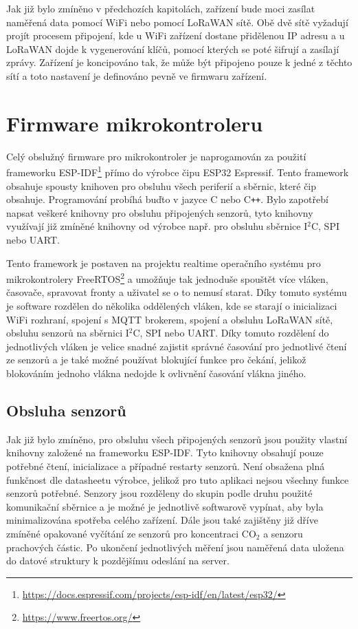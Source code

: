 Jak již bylo zmíněno v předchozích kapitolách, zařízení bude moci zasílat naměřená data pomocí WiFi nebo pomocí LoRaWAN sítě. Obě dvě sítě vyžadují projít procesem připojení, kde u WiFi zařízení dostane přidělenou IP adresu a u LoRaWAN dojde k vygenerování klíčů, pomocí kterých se poté šifrují a zasílají zprávy. Zařízení je koncipováno tak, že může být připojeno pouze k jedné z těchto sítí a toto nastavení je definováno pevně ve firmwaru zařízení. 

\section{Firmware mikrokontroleru}

Celý obslužný firmware pro mikrokontroler je naprogamován za použití frameworku ESP-IDF\footnote{\url{https://docs.espressif.com/projects/esp-idf/en/latest/esp32/}} přímo do výrobce čipu ESP32 Espressif. Tento framework obsahuje spousty knihoven pro obsluhu všech periferií a sběrnic, které čip obsahuje. Programování probíhá buďto v jazyce C nebo C\texttt{++}. Bylo zapotřebí napsat veškeré knihovny pro obsluhu připojených senzorů, tyto knihovny využívají již zmíněné knihovny od výrobce např. pro obsluhu sběrnice I$^2$C, SPI nebo UART.

Tento framework je postaven na projektu realtime operačního systému pro mikrokontrolery FreeRTOS\footnote{\url{https://www.freertos.org/}} a umožňuje tak jednoduše spouštět více vláken, časovače, spravovat fronty a uživatel se o to nemusí starat. Díky tomuto systému je software rozdělen do několika oddělených vláken, kde se starají o inicializaci WiFi rozhraní, spojení s MQTT brokerem, spojení a obsluhu LoRaWAN sítě, obsluhu senzorů na sběrnici I$^2$C, SPI nebo UART. Díky tomuto rozdělení do jednotlivých vláken je velice snadné zajistit správné časování pro jednotlivé čtení ze senzorů a je také možné používat blokující funkce pro čekání, jelikož blokováním jednoho vlákna nedojde k ovlivnění časování vlákna jiného.

\subsection{Obsluha senzorů}

Jak již bylo zmíněno, pro obsluhu všech připojených senzorů jsou použity vlastní knihovny založené na frameworku ESP-IDF. Tyto knihovny obsahují pouze potřebné čtení, inicializace a případné restarty senzorů. Není obsažena plná funkčnost dle datasheetu výrobce, jelikož pro tuto aplikaci nejsou všechny funkce senzorů potřebné. Senzory jsou rozděleny do skupin podle druhu použité komunikační sběrnice a je možné je jednotlivě softwarově vypínat, aby byla minimalizována spotřeba celého zařízení. Dále jsou také zajištěny již dříve zmíněné opakované vyčítání ze senzorů pro koncentraci CO$_2$ a senzoru prachových částic. Po ukončení jednotlivých měření jsou naměřená data uložena do datové struktury k pozdějšímu odeslání na server.


